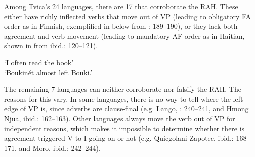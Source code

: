 \documentclass[output=paper,colorlinks,citecolor=brown,draft,draftmode]{langscibook}
\begin{document}
Among Tvica’s 24 languages, there are 17 that corroborate the RAH. These either have richly inflected verbs that move out of VP (leading to obligatory FA order as in Finnish, exemplified in  below from \citealt{Tvica2017}: 189–190), or they lack both agreement and verb movement (leading to mandatory AF order as in Haitian, shown in  from ibid.: 120–121).


\ea\label{ex:petzell:25}
\glt `I often read the book’  \\
\glt `Boukinét almost left Bouki.’
\z
\z


The remaining 7 languages can neither corroborate nor falsify the RAH. The reasons for this vary. In some languages, there is no way to tell where the left edge of VP is, since adverbs are clause-final (e.g. Lango, \citealt{Tvica2017}: 240–241, and Hmong Njua, ibid.: 162–163). Other languages always move the verb out of VP for independent reasons, which makes it impossible to determine whether there is agreement-triggered V-to-I going on or not (e.g. Quicgolani Zapotec, ibid.: 168–171, and Moro, ibid.: 242–244).
\end{document}
